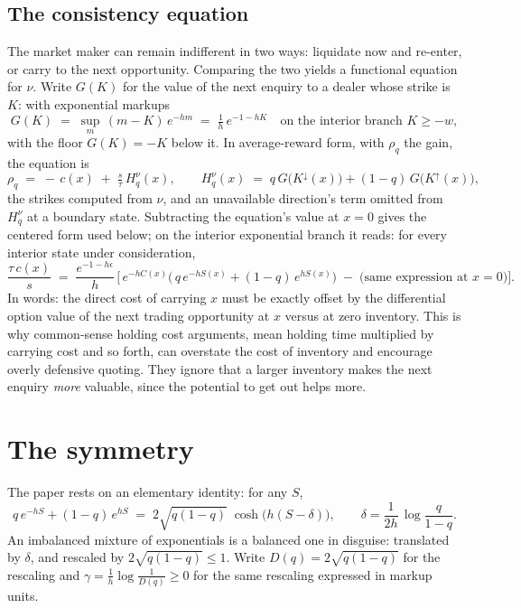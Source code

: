 \documentclass[11pt]{article}
\begin{document}
\subsection{The consistency equation}\label{sec:bellman}

The market maker can remain indifferent in two ways: liquidate now and re-enter, or carry to the next opportunity. Comparing the two yields a functional equation for $\nu$. Write $G(K)$ for the value of the next enquiry to a dealer whose strike is $K$: with exponential markups
\[
G(K) \;=\; \sup_m\,(m-K)\,e^{-hm} \;=\; \tfrac{1}{h}\,e^{-1-hK}
\quad \text{on the interior branch } K \ge -w,
\]
with the floor $G(K) = -K$ below it. In average-reward form, with $\rho_q$ the gain, the equation is
\[
\rho_q \;=\; -\,c(x) \;+\; \tfrac{s}{\tau}\,H^{\nu}_q(x), \qquad
H^{\nu}_q(x) \;=\; q\,G\big(K^{\downarrow}(x)\big) + (1-q)\,G\big(K^{\uparrow}(x)\big),
\]
the strikes computed from $\nu$, and an unavailable direction's term omitted from $H^{\nu}_q$ at a boundary state. Subtracting the equation's value at $x = 0$ gives the centered form used below; on the interior exponential branch it reads: for every interior state under consideration,
\begin{equation}
\frac{\tau\, c(x)}{s}
\;=\; \frac{e^{-1-h\epsilon}}{h}\,
\Big[\, e^{-hC(x)}\Big(\,q\,e^{-hS(x)} + (1-q)\,e^{hS(x)}\Big) \;-\; \big(\text{same expression at } x=0\big) \Big].
\label{eq:bellman}
\end{equation}
In words: the direct cost of carrying $x$ must be exactly offset by the differential option value of the next trading opportunity at $x$ versus at zero inventory. This is why common-sense holding cost arguments, mean holding time multiplied by carrying cost and so forth, can overstate the cost of inventory and encourage overly defensive quoting. They ignore that a larger inventory makes the next enquiry \emph{more} valuable, since the potential to get out helps more.

\section{The symmetry}\label{sec:theorem}

The paper rests on an elementary identity: for any $S$,
\begin{equation}
q\,e^{-hS} + (1-q)\,e^{hS}
\;=\; 2\sqrt{q(1-q)}\;\cosh\!\big(h(S - \delta)\big),
\qquad
\delta = \frac{1}{2h}\,\log\frac{q}{1-q} .
\label{eq:identity}
\end{equation}
An imbalanced mixture of exponentials is a balanced one in disguise: translated by $\delta$, and rescaled by $2\sqrt{q(1-q)} \le 1$. Write $D(q) = 2\sqrt{q(1-q)}$ for the rescaling and $\gamma = \tfrac{1}{h}\log\tfrac{1}{D(q)} \ge 0$ for the same rescaling expressed in markup units.
\end{document}
